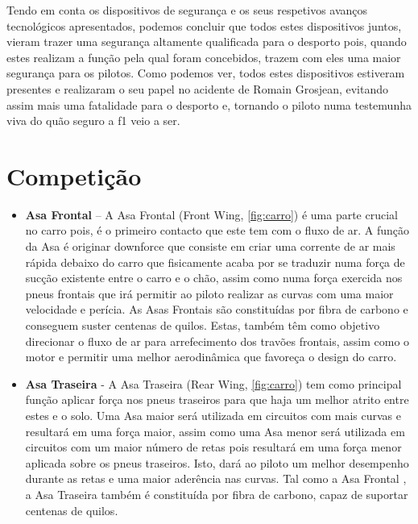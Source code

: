 \documentclass{report}
\begin{document}
Tendo em conta os dispositivos de segurança e os seus respetivos avanços tecnológicos apresentados, podemos concluir que todos estes dispositivos juntos, vieram trazer uma segurança altamente qualificada para o desporto pois, quando estes realizam a função pela qual foram concebidos, trazem com eles uma maior segurança para os pilotos. Como podemos ver, todos estes dispositivos estiveram presentes e realizaram o seu papel no acidente de Romain Grosjean, evitando assim mais uma fatalidade para o desporto e, tornando o piloto numa testemunha viva do quão seguro a \ac{f1} veio a ser.
	
\section{Competição}

\begin{itemize}

\item \textbf{Asa Frontal} – A Asa Frontal \cite{frontwing} (Front Wing, \autoref{fig:carro}) é uma parte crucial no carro pois, é o primeiro contacto que este tem com o fluxo de ar. A função da Asa é originar downforce que consiste em criar uma corrente de ar mais rápida debaixo do carro que fisicamente acaba por se traduzir numa força de sucção existente entre o carro e o chão, assim como numa força exercida nos pneus frontais que irá permitir ao piloto realizar as curvas com uma maior velocidade e perícia.
As Asas Frontais \cite{frontwing} são constituídas por fibra de carbono e conseguem suster centenas de quilos. Estas, também têm como objetivo direcionar o fluxo de ar para arrefecimento dos travões frontais, assim como o motor e permitir uma melhor aerodinâmica que favoreça o design do carro.\\[0.5cm]

\item \textbf{Asa Traseira} - A Asa Traseira \cite{rearwing} (Rear Wing, \autoref{fig:carro}) tem como principal função aplicar força nos pneus traseiros para que haja um melhor atrito entre estes e o solo. Uma Asa maior será utilizada em circuitos com mais curvas e resultará em uma força maior, assim como uma Asa menor será utilizada em circuitos com um maior número de retas pois resultará em uma força menor aplicada sobre os pneus traseiros. Isto, dará ao piloto um melhor desempenho durante as retas e uma maior aderência nas curvas.  Tal como a Asa Frontal \cite{frontwing}, a Asa Traseira \cite{rearwing} também é constituída por fibra de carbono, capaz de suportar centenas de quilos.


\end{itemize}
\end{document}
